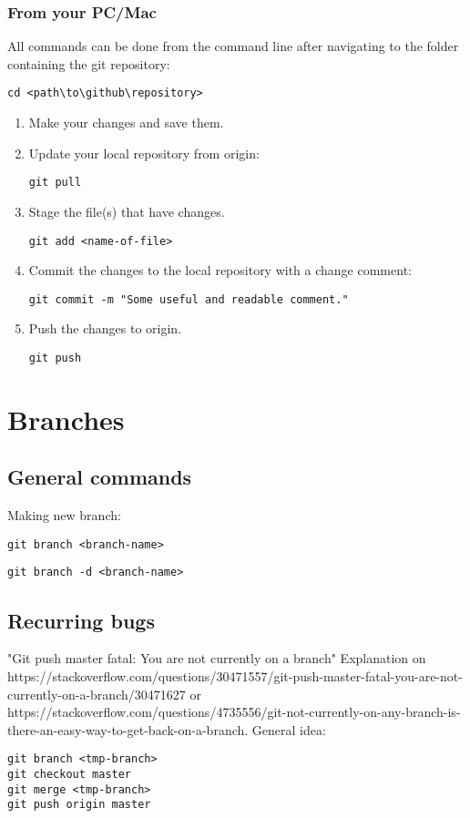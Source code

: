 \documentclass{article}
\begin{document}
\subsubsection{From your PC/Mac}
All commands can be done from the command line after navigating to the folder containing the git repository:
\begin{verbatim}
cd <path\to\github\repository>
\end{verbatim}

\begin{enumerate}
    \item Make your changes and save them.
    \item Update your local repository from origin:
	\begin{verbatim}
git pull   
    \end{verbatim}
	\item Stage the file(s) that have changes.
	\begin{verbatim}
git add <name-of-file>
    \end{verbatim}
	\item Commit the changes to the local repository with a change comment:
	\begin{verbatim}
git commit -m "Some useful and readable comment."
    \end{verbatim}
	\item Push the changes to origin.
	\begin{verbatim}
git push
    \end{verbatim}
\end{enumerate}

\section{Branches}

\subsection{General commands}
Making new branch:
\begin{verbatim}
git branch <branch-name>
\end{verbatim}

\begin{verbatim}
git branch -d <branch-name>
\end{verbatim}

\subsection{Recurring bugs}

"Git push master fatal: You are not currently on a branch"
Explanation on https://stackoverflow.com/questions/30471557/git-push-master-fatal-you-are-not-currently-on-a-branch/30471627 or https://stackoverflow.com/questions/4735556/git-not-currently-on-any-branch-is-there-an-easy-way-to-get-back-on-a-branch.
General idea:
\begin{verbatim}
git branch <tmp-branch>
git checkout master
git merge <tmp-branch>
git push origin master
\end{verbatim}
\end{document}
